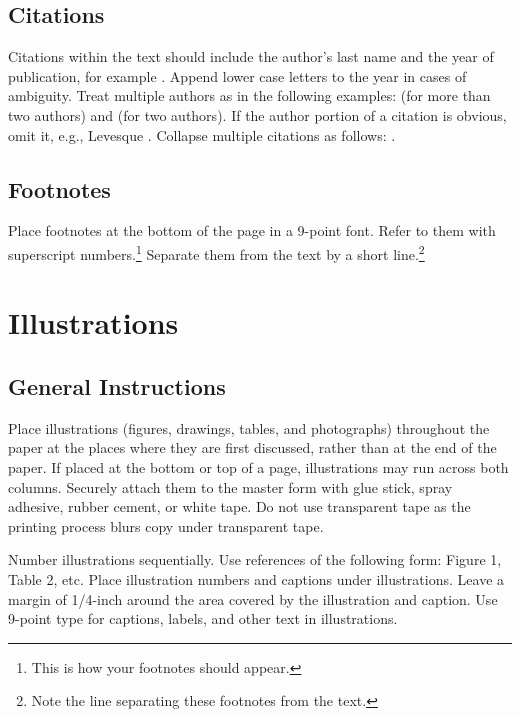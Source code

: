 \subsection{Citations}

Citations within the text should include the author's last name and
the year of publication, for example \cite{cheeseman:probability}.
Append lower case letters to the year in cases of ambiguity.
Treat multiple authors as in the following examples:
\cite{abelson-et-al:scheme} (for more than two authors) and
\cite{brachman-schmolze:kl-one} (for two authors).
If the author portion of a citation is obvious, omit it,
e.g., Levesque .
Collapse multiple citations as follows:
\cite{levesque:functional-foundations,haugeland:mind-design}.%
\nocite{abelson-et-al:scheme}%
\nocite{brachman-schmolze:kl-one}%
\nocite{cheeseman:probability}%
\nocite{haugeland:mind-design}%
\nocite{lenat:heuristics}%
\nocite{levesque:functional-foundations}%
\nocite{levesque:belief}

\subsection{Footnotes}

Place footnotes at the bottom of the page in a 9-point font.  Refer to them
with superscript numbers.\footnote{This is how your footnotes should
appear.} Separate them from the text by a short line.\footnote{Note the
line separating these footnotes from the text.}


\section{Illustrations}

\subsection{General Instructions}

Place illustrations (figures, drawings, tables, and photographs) throughout
the paper at the places where they are first discussed, rather than at the
end of the paper.  If placed at the bottom or top of a page, illustrations
may run across both columns.  Securely attach them to the master form with
glue stick, spray adhesive, rubber cement, or white tape.  Do not use
transparent tape as the printing process blurs copy under transparent tape.

Number illustrations sequentially.  Use references of the following form:
Figure 1, Table 2, etc.  Place illustration numbers and captions under
illustrations.  Leave a margin of 1/4-inch around the area covered by the
illustration and caption.  Use 9-point type for captions, labels, and
other text in illustrations.

